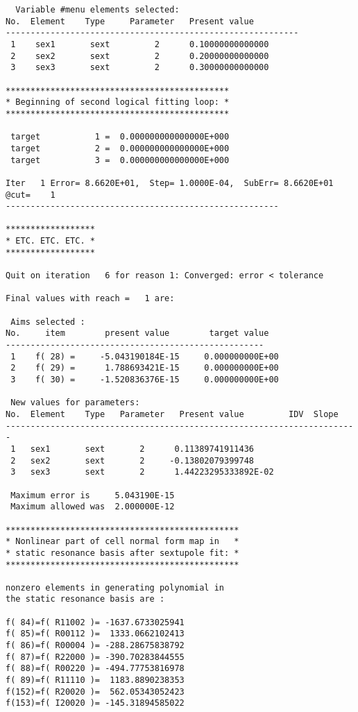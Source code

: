 \begin{footnotesize}
\begin{verbatim}
  Variable #menu elements selected:
No.  Element    Type     Parameter   Present value
-----------------------------------------------------------
 1    sex1       sext         2      0.10000000000000
 2    sex2       sext         2      0.20000000000000
 3    sex3       sext         2      0.30000000000000

*********************************************
* Beginning of second logical fitting loop: *
*********************************************

 target           1 =  0.000000000000000E+000
 target           2 =  0.000000000000000E+000
 target           3 =  0.000000000000000E+000

Iter   1 Error= 8.6620E+01,  Step= 1.0000E-04,  SubErr= 8.6620E+01 @cut=    1
-------------------------------------------------------

******************
* ETC. ETC. ETC. *
******************

Quit on iteration   6 for reason 1: Converged: error < tolerance

Final values with reach =   1 are:

 Aims selected :
No.     item        present value        target value
----------------------------------------------------
 1    f( 28) =     -5.043190184E-15     0.000000000E+00
 2    f( 29) =      1.788693421E-15     0.000000000E+00
 3    f( 30) =     -1.520836376E-15     0.000000000E+00

 New values for parameters:
No.  Element    Type   Parameter   Present value         IDV  Slope
-----------------------------------------------------------------------
 1   sex1       sext       2      0.11389741911436
 2   sex2       sext       2     -0.13802079399748
 3   sex3       sext       2      1.44223295333892E-02

 Maximum error is     5.043190E-15
 Maximum allowed was  2.000000E-12

***********************************************
* Nonlinear part of cell normal form map in   *
* static resonance basis after sextupole fit: *
***********************************************

nonzero elements in generating polynomial in
the static resonance basis are :

f( 84)=f( R11002 )= -1637.6733025941
f( 85)=f( R00112 )=  1333.0662102413
f( 86)=f( R00004 )= -288.28675838792
f( 87)=f( R22000 )= -390.70283844555
f( 88)=f( R00220 )= -494.77753816978
f( 89)=f( R11110 )=  1183.8890238353
f(152)=f( R20020 )=  562.05343052423
f(153)=f( I20020 )= -145.31894585022


\end{verbatim}
\end{footnotesize}
